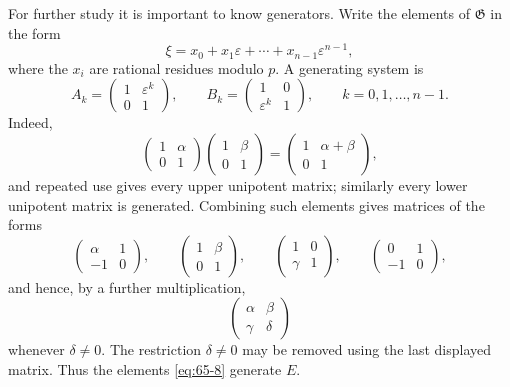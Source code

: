 \documentclass[11pt,a4paper]{book}
\begin{document}
For further study it is important to know generators.  Write the elements of \(\mathfrak G\) in the form
\begin{equation}\label{eq:65-7}
 \xi=x_0+x_1\varepsilon+\cdots+x_{n-1}\varepsilon^{n-1},
\end{equation}
where the \(x_i\) are rational residues modulo \(p\).  A generating system is
\begin{equation}\label{eq:65-8}
 A_k=\begin{pmatrix}1&\varepsilon^k\\0&1\end{pmatrix},
 \qquad
 B_k=\begin{pmatrix}1&0\\\varepsilon^k&1\end{pmatrix},
 \qquad k=0,1,\ldots,n-1.
\end{equation}
Indeed,
\[
 \begin{pmatrix}1&\alpha\\0&1\end{pmatrix}
 \begin{pmatrix}1&\beta\\0&1\end{pmatrix}
 =
 \begin{pmatrix}1&\alpha+\beta\\0&1\end{pmatrix},
\]
and repeated use gives every upper unipotent matrix; similarly every lower unipotent matrix is generated.  Combining such elements gives matrices of the forms
\[
 \begin{pmatrix}\alpha&1\\-1&0\end{pmatrix},
 \qquad
 \begin{pmatrix}1&\beta\\0&1\end{pmatrix},
 \qquad
 \begin{pmatrix}1&0\\\gamma&1\end{pmatrix},
 \qquad
 \begin{pmatrix}0&1\\-1&0\end{pmatrix},
\]
and hence, by a further multiplication,
\begin{equation}\label{eq:65-11}
 \begin{pmatrix}\alpha&\beta\\\gamma&\delta\end{pmatrix}
\end{equation}
whenever \(\delta\ne0\).  The restriction \(\delta\ne0\) may be removed using the last displayed matrix.  Thus the elements \eqref{eq:65-8} generate \(E\).
\end{document}
